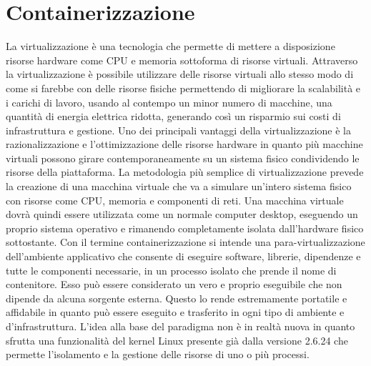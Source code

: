 
\section{Containerizzazione}
La virtualizzazione è una tecnologia che permette di mettere a disposizione risorse hardware come CPU e memoria sottoforma di risorse virtuali. Attraverso la virtualizzazione è possibile utilizzare delle risorse virtuali allo stesso modo di come si farebbe con delle risorse fisiche permettendo di migliorare la scalabilità e i carichi di lavoro, usando al contempo un minor numero di macchine, una quantità di energia elettrica ridotta, generando così un risparmio sui costi di infrastruttura e gestione.
Uno dei principali vantaggi della virtualizzazione è la razionalizzazione e l'ottimizzazione delle risorse hardware in quanto più macchine virtuali possono girare contemporaneamente su un sistema fisico condividendo le risorse della piattaforma.
La metodologia più semplice di virtualizzazione prevede la creazione di una macchina virtuale che va a simulare un'intero sistema fisico con risorse come CPU, memoria e componenti di reti. Una macchina virtuale dovrà quindi essere utilizzata come un normale computer desktop, eseguendo un proprio sistema operativo e rimanendo completamente isolata dall'hardware fisico sottostante.
Con il termine containerizzazione si intende una para-virtualizzazione dell'ambiente applicativo che consente di eseguire software, librerie, dipendenze e tutte le componenti necessarie, in un processo isolato che prende il nome di contenitore. Esso può essere considerato un vero e proprio eseguibile che non dipende da alcuna sorgente esterna. Questo lo rende estremamente portatile e affidabile in quanto può essere eseguito e trasferito in ogni tipo di ambiente e d'infrastruttura.
L'idea alla base del paradigma non è in realtà nuova in quanto sfrutta una funzionalità del kernel Linux presente già dalla versione 2.6.24 che permette l'isolamento e la gestione delle risorse di uno o più processi.


